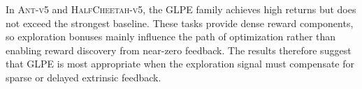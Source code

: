In \textsc{Ant-v5} and \textsc{HalfCheetah-v5}, the GLPE family achieves high returns but does not exceed the strongest baseline.
These tasks provide dense reward components, so exploration bonuses mainly influence the path of optimization rather than enabling reward discovery from near-zero feedback.
The results therefore suggest that GLPE is most appropriate when the exploration signal must compensate for sparse or delayed extrinsic feedback.